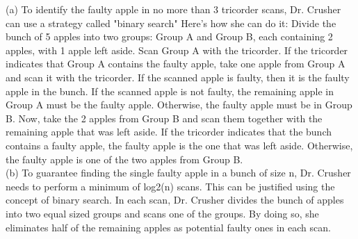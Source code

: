 \documentclass[a4paper]{exam}
\begin{document}
\begin{questions}
\begin{solution}
    (a)
    To identify the faulty apple in no more than 3 tricorder scans, Dr. Crusher can use a strategy called "binary search" Here's how she can do it:
    Divide the bunch of 5 apples into two groups: Group A and Group B, each containing 2 apples, with 1 apple left aside.
    Scan Group A with the tricorder. If the tricorder indicates that Group A contains the faulty apple, take one apple from Group A and scan it with the tricorder. If the scanned apple is faulty, then it is the faulty apple in the bunch. If the scanned apple is not faulty, the remaining apple in Group A must be the faulty apple. Otherwise, the faulty apple must be in Group B.
    Now, take the 2 apples from Group B and scan them together with the remaining apple that was left aside. If the tricorder indicates that the bunch contains a faulty apple, the faulty apple is the one that was left aside. Otherwise, the faulty apple is one of the two apples from Group B. \\
    (b) To guarantee finding the single faulty apple in a bunch of size n, Dr. Crusher needs to perform a minimum of log2(n) scans. This can be justified using the concept of binary search.
    In each scan, Dr. Crusher divides the bunch of apples into two equal sized groups and scans one of the groups. By doing so, she eliminates half of the remaining apples as potential faulty ones in each scan.
\end{solution}

\end{questions}
\end{document}

